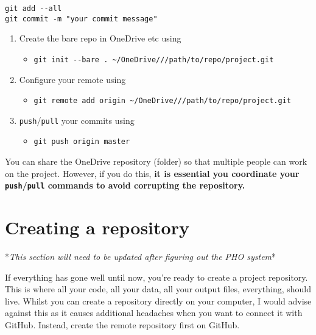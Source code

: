 \documentclass[]{book}
\providecommand{\tightlist}{%
  \setlength{\itemsep}{0pt}\setlength{\parskip}{0pt}}
\begin{document}
\begin{verbatim}
git add --all
git commit -m "your commit message"
\end{verbatim}

\begin{enumerate}
\def\labelenumi{\arabic{enumi}.}
\setcounter{enumi}{3}
\tightlist
\item
  Create the bare repo in OneDrive etc using

  \begin{itemize}
  \tightlist
  \item
    \texttt{git\ init\ -\/-bare\ .\ \textasciitilde{}/OneDrive///path/to/repo/project.git}
  \end{itemize}
\item
  Configure your remote using

  \begin{itemize}
  \tightlist
  \item
    \texttt{git\ remote\ add\ origin\ \textasciitilde{}/OneDrive///path/to/repo/project.git}
  \end{itemize}
\item
  \texttt{push}/\texttt{pull} your commits using

  \begin{itemize}
  \tightlist
  \item
    \texttt{git\ push\ origin\ master}
  \end{itemize}
\end{enumerate}

You can share the OneDrive repository (folder) so that multiple people can work on the project. However, if you do this, \textbf{it is essential you coordinate your \texttt{push}/\texttt{pull} commands to avoid corrupting the repository.}

\hypertarget{creating-a-repository}{%
\section{Creating a repository}\label{creating-a-repository}}

*\emph{This section will need to be updated after figuring out the PHO system}*

If everything has gone well until now, you're ready to create a project repository. This is where all your code, all your data, all your output files, everything, should live. Whilst you can create a repository directly on your computer, I would advise against this as it causes additional headaches when you want to connect it with GitHub. Instead, create the remote repository first on GitHub.
\end{document}
